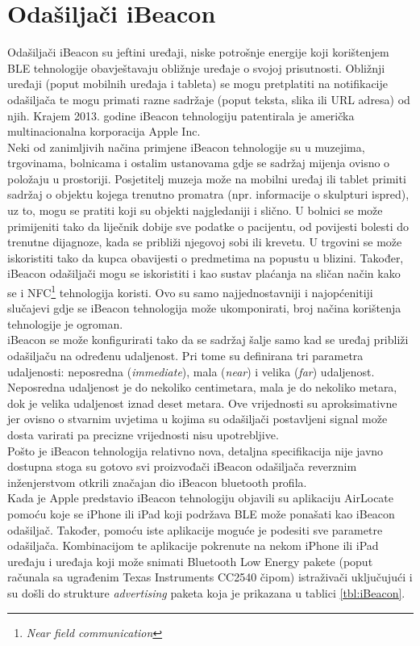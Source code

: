 \chapter{Odašiljači iBeacon}

Odašiljači iBeacon su jeftini uređaji, niske potrošnje energije koji korištenjem BLE tehnologije obavještavaju obližnje uređaje o svojoj prisutnosti. 
Obližnji uređaji (poput mobilnih uređaja i tableta) se mogu pretplatiti na notifikacije odašiljača te mogu primati razne sadržaje (poput teksta, slika ili URL adresa) od njih. 
Krajem 2013. godine iBeacon tehnologiju patentirala je američka multinacionalna korporacija Apple Inc.
\\

Neki od zanimljivih načina primjene iBeacon tehnologije su u muzejima, trgovinama, bolnicama i ostalim ustanovama gdje se sadržaj mijenja ovisno o položaju u prostoriji. 
Posjetitelj muzeja može na mobilni uređaj ili tablet primiti sadržaj o objektu kojega trenutno promatra (npr. informacije o skulpturi ispred), uz to, mogu se pratiti koji su objekti najgledaniji i slično. 
U bolnici se može primijeniti tako da liječnik dobije sve podatke o pacijentu, od povijesti bolesti do trenutne dijagnoze, kada se približi njegovoj sobi ili krevetu. 
U trgovini se može iskoristiti tako da kupca obavijesti o predmetima na popustu u blizini. 
Također, iBeacon odašiljači mogu se iskoristiti i kao sustav plaćanja na sličan način kako se i NFC\footnote{\textit{Near field communication}} tehnologija koristi.
Ovo su samo najjednostavniji i najopćenitiji slučajevi gdje se iBeacon tehnologija može ukomponirati, broj načina korištenja tehnologije je ogroman.
\\

iBeacon se može konfigurirati tako da se sadržaj šalje samo kad se uređaj približi odašiljaču na određenu udaljenost. 
Pri tome su definirana tri parametra udaljenosti: neposredna (\textit{immediate}), mala (\textit{near}) i velika (\textit{far}) udaljenost. 
Neposredna udaljenost je do nekoliko centimetara, mala je do nekoliko metara, dok je velika udaljenost iznad deset metara. 
Ove vrijednosti su aproksimativne jer ovisno o stvarnim uvjetima u kojima su odašiljači postavljeni signal može dosta varirati pa precizne vrijednosti nisu upotrebljive.
\\

Pošto je iBeacon tehnologija relativno nova, detaljna specifikacija nije javno dostupna stoga su gotovo svi proizvođači iBeacon odašiljača reverznim inženjerstvom otkrili značajan dio iBeacon bluetooth profila.
\\
Kada je Apple predstavio iBeacon tehnologiju objavili su aplikaciju AirLocate pomoću koje se iPhone ili iPad koji podržava BLE može ponašati kao iBeacon odašiljač. 
Također, pomoću iste aplikacije moguće je podesiti sve parametre odašiljača. 
Kombinacijom te aplikacije pokrenute na nekom iPhone ili iPad uređaju i uređaja koji može snimati Bluetooth Low Energy pakete (poput računala sa ugrađenim Texas Instruments CC2540 čipom) istraživači uključujući i \cite{radiusReverseEng} su došli do strukture \textit{advertising} paketa koja je prikazana u tablici \ref{tbl:iBeacon}.

